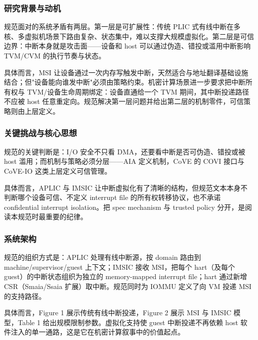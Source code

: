 \documentclass[11pt]{ctexart}
\begin{document}
\subsubsection{研究背景与动机}
规范面对的系统矛盾有两层。第一层是可扩展性：传统 PLIC 式有线中断在多核、多虚拟机场景下路由复杂、状态集中，难以支撑大规模虚拟化。第二层是可信边界：中断本身就是攻击面——设备和 host 可以通过伪造、错投或滥用中断影响 TVM/CVM 的执行节奏与状态。\par
具体而言，MSI 让设备通过一次内存写触发中断，天然适合与地址翻译基础设施结合；但"设备能向谁发中断"必须由策略约束。机密计算场景进一步要求把中断所有权与 TVM/设备生命周期绑定：设备直通给一个 TVM 期间，其中断投递路径不应被 host 任意重定向。规范解决第一层问题并给出第二层的机制零件，可信策略则由上层定义。\par
\subsubsection{关键挑战与核心思想}
规范的关键判断是：I/O 安全不只看 DMA，还要看中断是否可伪造、错投或被 host 滥用；而机制与策略必须分层——AIA 定义机制，CoVE 的 COVI 接口与 CoVE-IO 这类上层定义可信管理。\par
具体而言，APLIC 与 IMSIC 让中断虚拟化有了清晰的结构，但规范文本本身不判断哪个设备可信、不定义 interrupt file 的所有权转移协议，也不承诺 confidential interrupt isolation。把 spec mechanism 与 trusted policy 分开，是阅读本规范时最重要的纪律。\par
\subsubsection{系统架构}
规范的组织方式是：APLIC 处理有线中断源，按 domain 路由到 machine/supervisor/guest 上下文；IMSIC 接收 MSI，把每个 hart（及每个 guest）的中断状态组织为独立的 memory-mapped interrupt file；hart 通过新增 CSR（Smaia/Ssaia 扩展）取中断。规范同时为 IOMMU 定义了向 VM 投递 MSI 的支持路径。\par
具体而言，Figure 1 展示传统有线中断投递，Figure 2 展示 MSI 与 IMSIC 模型，Table 1 给出规模限制参数。虚拟化支持使 guest 中断投递不再依赖 host 软件注入的单一通路，这是它在机密计算叙事中的价值起点。\par
\end{document}
